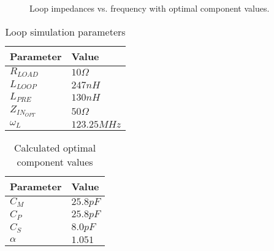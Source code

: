 \newpage
\begin{figure}
    \centering
    
    \caption{Loop impedances vs. frequency with optimal component values.}
    \label{fig:impedance_plot}
\end{figure}

\begin{table}[]
\centering
\caption{Loop simulation parameters}
\label{tab:sim_independent}
\begin{tabular}{|l|l|}
\hline
Parameter  & Value       \\
\hline
$R_{LOAD}$ & $10\Omega$  \\
$L_{LOOP}$ & $247nH$     \\
$L_{PRE}$  & $130nH$     \\
$Z_{IN_{OPT}}$  & $50\Omega$     \\
$\omega_L$ & $123.25MHz$ \\
\hline
\end{tabular}
\end{table}

\begin{table}[]
\centering
\caption{Calculated optimal component values}
\label{tab:sim_dependent}
\begin{tabular}{|l|l|}
\hline
Parameter & Value       \\
\hline
$C_M$     & $25.8pF$  \\
$C_P$     & $25.8pF$     \\
$C_S$     & $8.0pF$     \\
$\alpha$  & $1.051$ \\
\hline
\end{tabular}
\end{table}
